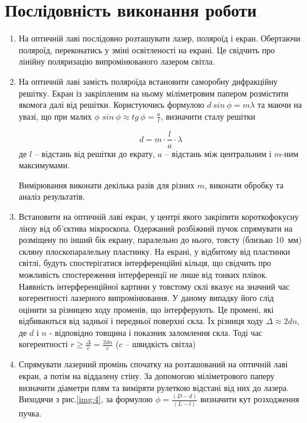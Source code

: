 \documentclass[twocolumn]{el-author}
\begin{document}
\newpage

\section{Послідовність виконання роботи}

\begin{enumerate}
	\item На оптичній лаві послідовно розташувати лазер, поляроїд і екран.
Обертаючи поляроїд, переконатись у зміні освітленості на екрані.
Це свідчить про лінійну поляризацію випромінюваного лазером
світла.
	\item На оптичній лаві замість поляроїда встановити саморобну
дифракційну решітку. Екран із закріпленим на ньому
міліметровим папером розмістити якомога далі від решітки.
Користуючись формулою $d~sin~ \phi = m \lambda$ та маючи на увазі, що при
малих $\phi$ $sin~ \phi \approx tg~ \phi = \frac{a}{l}$, визначити сталу решітки

\begin{equation} \label{eq:1}
d = m \cdot \frac{l}{a} \cdot \lambda
\end{equation}
де $l$ -- відстань від решітки до екрату, $a$ -- відстань між центральним і $m$-ним максимумами.

Вимірювання виконати декілька разів для різних $m$,
виконати обробку та аналіз результатів.
	\item Встановити на оптичній лаві екран, у центрі якого закріпити
короткофокусну лінзу від об'єктива мікроскопа. Одержаний
розбіжний пучок спрямувати на розміщену по інший бік екрану,
паралельно до нього, товсту (близько 10~мм) скляну
плоскопаралельну пластинку. На екрані, у відбитому від
пластинки світлі, будуть спостерігатися інтерференційні кільця,
що свідчить про можливість спостереження інтерференції не
лише від тонких плівок. Наявність інтерференційної картини у
товстому склі вказує на значний час когерентності лазерного
випромінювання. У даному випадку його слід оцінити за
різницею ходу променів, що інтерферують. Це промені, які
відбиваються від задньої і передньої поверхні скла. Їх різниця
ходу $\Delta \approx 2dn$, де $d$ і $n$ - відповідно товщина і показник заломлення
скла. Тоді час когерентності $r \geq \frac{\Delta}{c} = \frac{2dn}{c}$
($c$ -- швидкість світла)
	\item Спрямувати лазерний промінь спочатку на розташований на
оптичній лаві екран, а потім на віддалену стіну. За допомогою
міліметрового паперу визначити діаметри плям та виміряти
рулеткою відстані від них до лазера. Виходячи з рис.\ref{img:4}, за
формулою $\phi = \frac{(D-d)}{(L-l)}$ визначити кут розходження пучка.


\end{enumerate}
\end{document}
